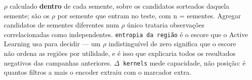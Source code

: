 \footnotesize $\rho$ calculado \textbf{dentro} de cada semente, sobre os candidatos sorteados daquela semente; são os $\rho$ por semente que entram no teste, com n = sementes. Agregar candidatos de sementes diferentes num $\rho$ único trataria observações correlacionadas como independentes. \texttt{entropia da região} é o escore que o Active Learning usa para decidir --- um $\rho$ indistinguível de zero significa que o escore não ordena as regiões por utilidade, e é isso que explicaria todos os resultados negativos das campanhas anteriores. \texttt{$\Delta$ kernels} mede capacidade, não posição: é quantos filtros a mais o encoder extraiu com o marcador extra.
\normalsize
